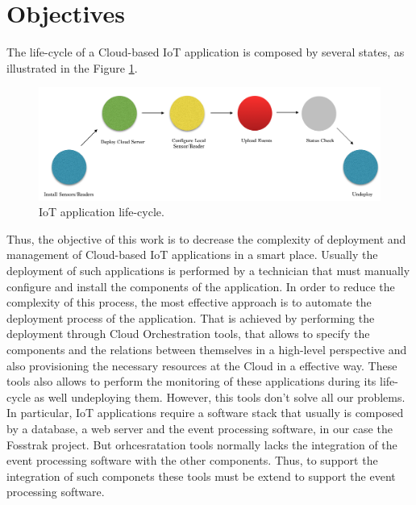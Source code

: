 \section{Objectives}
\label{sec:objectives}
The life-cycle of a Cloud-based IoT application is composed by several states, as illustrated in the Figure \ref{fig:life-cycle}.
\begin{figure}[h!]
  \centering
  \includegraphics[width=\textwidth]{./images/life-cycle}
  \caption{IoT application life-cycle.}
  \label{fig:life-cycle}
\end{figure}

Thus, the objective of this work is to decrease the complexity of deployment and management of Cloud-based IoT applications in a smart place.
Usually the deployment of such applications is performed by a technician that must manually configure and install the components of the application.
In order to reduce the complexity of this process, the most effective approach is to automate the deployment process of the application. That is achieved
by performing the deployment through Cloud Orchestration tools, that allows to specify the components and the relations between themselves in a high-level
perspective and also provisioning the necessary resources at the Cloud in a effective way. These tools also allows to perform the monitoring of these applications
during its life-cycle as well undeploying them. However, this tools don't solve all our problems. In particular, IoT applications require a software stack that usually
is composed by a database, a web server and the event processing software, in our case the Fosstrak project. But orhcesratation tools normally lacks the integration of
the event processing software with the other components. Thus, to support the integration of such componets these tools must be extend to support the event processing
software.\\

